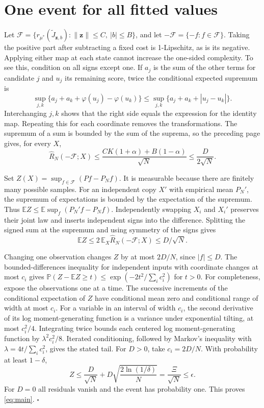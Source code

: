 \documentclass[12pt,a4paper]{article}
\newcommand{\E}{\mathbb E}
\newcommand{\Prob}{\mathbb P}
\begin{document}
\section*{One event for all fitted values}
Let \(\mathcal F=\{r_{\mu^*}(\widetilde J_{\mathbf z,b}) :
\|\mathbf z\|\le C,\ |b|\le B\}\), and let \(-\mathcal F=\{-f:f\in\mathcal F\}\).
Taking the positive part after subtracting a fixed cost is 1-Lipschitz,
as is its negative. Applying either map at each state cannot increase
the one-sided complexity. To see this, condition on all signs except
one. If \(a_j\) is the sum of the other terms for candidate \(j\) and
\(u_j\) its remaining score, twice the conditional expected supremum is
\[
 \sup_{j,k}\{a_j+a_k+\varphi(u_j)-\varphi(u_k)\}
 \le \sup_{j,k}\{a_j+a_k+|u_j-u_k|\}.
\]
Interchanging \(j,k\) shows that the right side equals the expression for
the identity map. Repeating this for each coordinate removes the
transformations. The supremum of a sum is bounded by the sum of the
suprema, so the preceding page gives, for every \(X\),
\[
 \widehat R_N(-\mathcal F;X)
 \le \frac{CK(1+\alpha)+B(1-\alpha)}{\sqrt N}
 \le \frac{D}{2\sqrt N}.
\]

Set \(Z(X)=\sup_{f\in\mathcal F}(Pf-P_N f)\). It is measurable because
there are finitely many possible samples. For an independent copy \(X'\)
with empirical mean \(P_N'\), the supremum of expectations is bounded by the expectation of the supremum. Thus \(\E Z\le \E\sup_f(P_N'f-P_N f)\). Independently swapping \(X_i\)
and \(X_i'\) preserves their joint law and inserts independent signs into
the difference. Splitting the signed sum at the supremum and using
symmetry of the signs gives
\[
 \E Z\le 2\,\E_X \widehat R_N(-\mathcal F;X)\le D/\sqrt N .
\]

Changing one observation changes \(Z\) by at most \(2D/N\), since
\(|f|\le D\). The bounded-differences inequality for independent inputs
with coordinate changes at most \(c_i\) gives
\(\Prob(Z-\E Z\ge t)\le\exp(-2t^2/\sum_i c_i^2)\) for \(t>0\).
For completeness, expose the observations one at a time. The successive
increments of the conditional expectation of \(Z\) have conditional mean
zero and conditional range of width at most \(c_i\). For a variable in an
interval of width \(c_i\), the second derivative of its log moment-generating
function is a variance under exponential tilting, at most \(c_i^2/4\).
Integrating twice bounds each centered log moment-generating function
by \(\lambda^2 c_i^2/8\). Iterated conditioning, followed by Markov's
inequality with \(\lambda=4t/\sum_i c_i^2\), gives the stated tail.
For \(D>0\), take \(c_i=2D/N\). With probability at least \(1-\delta\),
\[
 Z\le\frac{D}{\sqrt N}+D\sqrt{\frac{2\ln(1/\delta)}{N}}
   =\frac{\Xi}{\sqrt N}\le\epsilon .
\]
For \(D=0\) all residuals vanish and the event has probability one.
This proves \eqref{eq:main}. \hfill\(\square\)
\end{document}
